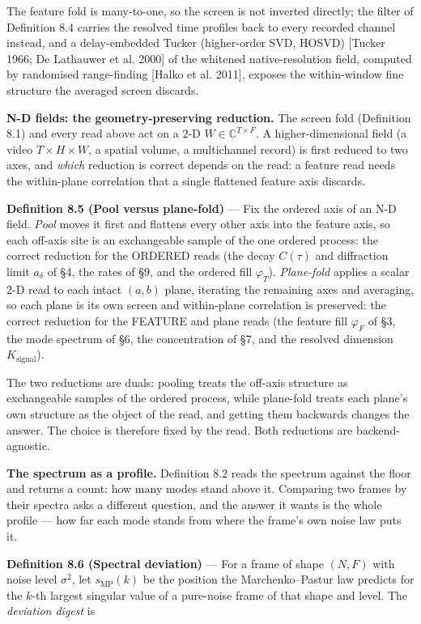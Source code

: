 \documentclass[10pt,letterpaper,twocolumn]{article}
\begin{document}
The feature fold is many-to-one, so the screen is not inverted directly; the filter of Definition 8.4 carries the resolved time profiles back to every recorded channel instead, and a delay-embedded Tucker (higher-order SVD, HOSVD) {[}Tucker 1966; De Lathauwer et al. 2000{]} of the whitened native-resolution field, computed by randomised range-finding {[}Halko et al. 2011{]}, exposes the within-window fine structure the averaged screen discards.

\textbf{N-D fields: the geometry-preserving reduction.} The screen fold (Definition 8.1) and every read above act on a 2-D \(W\in\mathbb{C}^{T\times F}\). A higher-dimensional field (a video \(T\times H\times W\), a spatial volume, a multichannel record) is first reduced to two axes, and \emph{which} reduction is correct depends on the read: a feature read needs the within-plane correlation that a single flattened feature axis discards.

\textbf{Definition 8.5 (Pool versus plane-fold)} --- Fix the ordered axis of an N-D field. \emph{Pool} moves it first and flattens every other axis into the feature axis, so each off-axis site is an exchangeable sample of the one ordered process: the correct reduction for the ORDERED reads (the decay \(C(\tau)\) and diffraction limit \(a_\delta\) of §4, the rates of §9, and the ordered fill \(\varphi_T\)). \emph{Plane-fold} applies a scalar 2-D read to each intact \((a,b)\) plane, iterating the remaining axes and averaging, so each plane is its own screen and within-plane correlation is preserved: the correct reduction for the FEATURE and plane reads (the feature fill \(\varphi_F\) of §3, the mode spectrum of §6, the concentration of §7, and the resolved dimension \(K_{\mathrm{signal}}\)).

The two reductions are duals: pooling treats the off-axis structure as exchangeable samples of the ordered process, while plane-fold treats each plane's own structure as the object of the read, and getting them backwards changes the answer. The choice is therefore fixed by the read. Both reductions are backend-agnostic.

\textbf{The spectrum as a profile.} Definition 8.2 reads the spectrum against the floor and returns a count: how many modes stand above it. Comparing two frames by their spectra asks a different question, and the answer it wants is the whole profile --- how far each mode stands from where the frame's own noise law puts it.

\textbf{Definition 8.6 (Spectral deviation)} --- For a frame of shape \((N,F)\) with noise level \(\sigma^2\), let \(s_{\mathrm{MP}}(k)\) be the position the Marchenko--Pastur law predicts for the \(k\)-th largest singular value of a pure-noise frame of that shape and level. The \emph{deviation digest} is
\end{document}
